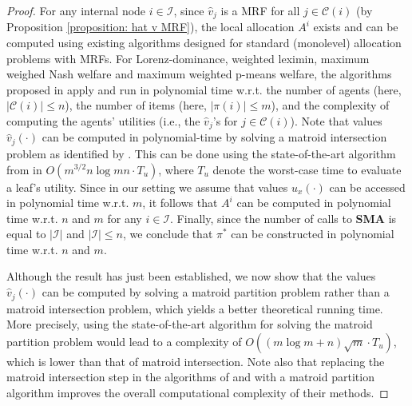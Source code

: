 \documentclass[]{article}
\newcommand{\children}{\mathcal{C}}
\newcommand{\internal}{\mathcal{I}}
\begin{document}
\begin{proof}
For any internal node $i\in \internal$, since $\hat{v}_j$ is a MRF for all $j\in \children(i)$ (by Proposition \ref{proposition: hat v MRF}), the local allocation $A^i$ exists and can be computed using existing algorithms designed for standard (monolevel) allocation problems with MRFs. For Lorenz-dominance, weighted leximin, maximum weighed Nash welfare and maximum weighted p-means welfare, the algorithms proposed in \cite{Babaioff_et_al2021, Viswanathan_Zick2023b} apply and run in polynomial time w.r.t. the number of agents (here, $|\children(i)| \le n$), the number of items (here, $|\pi(i)| \le m$), and the complexity of computing the agents' utilities (i.e., the $\hat{v}_j$'s for $j \in \children(i)$). Note that values $\hat{v}_j(\cdot)$ can be computed in polynomial-time by solving a matroid intersection problem as identified by \cite{Benabbou_et_al2021}. 
This can be done using the state-of-the-art algorithm from \cite{Chakrabarty_et_al2019} in $O(m^{3/2} n \log mn \cdot T_u)$, 
where $T_u$ denote the worst-case time to evaluate a leaf’s utility. Since in our setting we assume that values $u_x(\cdot)$ can be accessed in polynomial time w.r.t. $m$, it follows that $A^i$ can be computed in polynomial time  w.r.t. $n$ and $m$ for any $i \in \internal$. 
Finally, since the number of calls to {\bf SMA} is equal to $|\internal|$ and $|\internal| \le n$, we conclude that $\pi^*$ can be constructed in polynomial time w.r.t. $n$ and $m$. 



Although the result has just been established, we now show that the values $\hat{v}_j(\cdot)$ can be computed by solving a matroid partition problem rather than a matroid intersection problem, which yields a better theoretical running time. More precisely, using the state-of-the-art algorithm for solving the matroid partition problem \cite{Terao2025} would lead to a complexity of $O((m \log m + n)\sqrt{m} \cdot T_u)$, which is lower than that of matroid intersection. Note also that replacing the matroid intersection step in the algorithms of \cite{Benabbou_et_al2021} and \cite{Babaioff_et_al2021} with a matroid partition algorithm improves the overall computational complexity of their methods. 


\end{proof}
\end{document}
